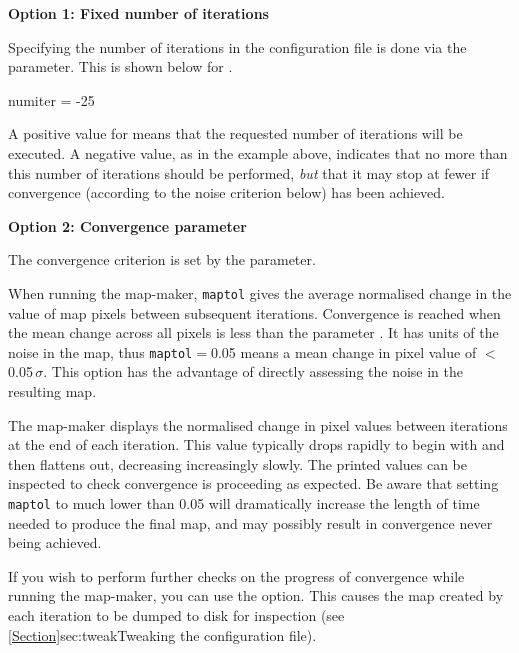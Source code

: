 \textbf{Option 1: Fixed number of iterations}

Specifying the number of iterations in the configuration file is done
via the  parameter. This is shown below for
.

\begin{terminalv}
numiter = -25
\end{terminalv}

A positive value for  means that the requested number
of iterations will be executed. A negative value, as in the example
above, indicates that no more than this number of iterations should be
performed, \emph{but} that it may stop at fewer if convergence
(according to the noise criterion below) has been achieved.

\textbf{Option 2: Convergence parameter}

The convergence criterion is set by the  parameter.

When running the map-maker, \texttt{maptol} gives the average
normalised change in the value of map pixels
between subsequent iterations. Convergence is reached when the  mean
change across all pixels is less than the parameter .
It has units of the noise in the map, thus \texttt{maptol}$=$0.05 means
a mean change in pixel value of $<$0.05\,$\sigma$. This option has the
advantage of directly assessing the noise in the resulting map.

The map-maker displays the normalised change in pixel values between
iterations at the end of each iteration. This value typically drops
rapidly to begin with and then flattens out, decreasing increasingly
slowly.  The printed values can be inspected to check convergence is
proceeding as expected. Be aware that setting \texttt{maptol} to much
lower than 0.05 will dramatically increase the length of time needed to
produce the final map, and may possibly result in convergence never being
achieved.

If you wish to perform further checks on the progress of convergence
while running the map-maker, you can use the 
option. This causes the map created by each iteration to be dumped to
disk for inspection (see \cref{Section}{sec:tweak}{Tweaking the
configuration file}).

